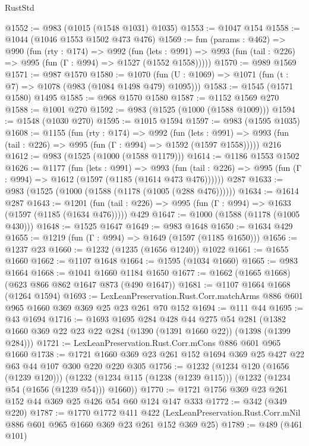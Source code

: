 \begin{lexlean}{RustStd}
\begin{coremodule}
@1552 := @983 (@1015 (@1548 @1031) @1035)
@1553 := @1047 @154
@1558 := @1044 (@1046 @1553 @1502 @473 @476)
@1569 := fun (params : @462) =>
  @990
    (fun (rty : @174) =>
    @992
      (fun (lets : @991) =>
      @993 (fun (tail : @226) => @995 (fun (Γ : @994) => @1527 (@1552 @1558)))))
@1570 := @989 @1569
@1571 := @987 @1570
@1580 := @1070 (fun (U : @1069) => @1071 (fun (t : @7) => @1078 (@983 (@1084 @1498 @479) @1095)))
@1583 := @1545 (@1571 @1580) @1495
@1585 := @968 @1570 @1580
@1587 := @1152 @1569 @270
@1588 := @1001 @270
@1592 := @983 (@1525 (@1000 (@1588 @1009)))
@1594 := @1548 (@1030 @270)
@1595 := @1015 @1594
@1597 := @983 (@1595 @1035)
@1608 := @1155
    (fun (rty : @174) =>
    @992
      (fun (lets : @991) =>
      @993 (fun (tail : @226) => @995 (fun (Γ : @994) => @1592 (@1597 @1558)))))
    @216
@1612 := @983 (@1525 (@1000 (@1588 @1179)))
@1614 := @1186 @1553 @1502
@1626 := @1177
    (fun (lets : @991) =>
    @993 (fun (tail : @226) => @995 (fun (Γ : @994) => @1612 (@1597 (@1185 (@1614 @473 @476))))))
    @287
@1633 := @983 (@1525 (@1000 (@1588 (@1178 (@1005 (@288 @476))))))
@1634 := @1614 @287
@1643 := @1201
    (fun (tail : @226) => @995 (fun (Γ : @994) => @1633 (@1597 (@1185 (@1634 @476)))))
    @429
@1647 := @1000 (@1588 (@1178 (@1005 @430)))
@1648 := @1525 @1647
@1649 := @983 @1648
@1650 := @1634 @429
@1655 := @1219 (fun (Γ : @994) => @1649 (@1597 (@1185 @1650)))
@1656 := @1237 @23
@1660 := @1232 (@1235 (@1656 @1240)) @1022
@1661 := @1655 @1660
@1662 := @1107 @1648
@1664 := @1595 (@1034 @1660)
@1665 := @983 @1664
@1668 := @1041 @1660 @1184 @1650
@1677 := @1662 (@1665 @1668) (@623 @866 @862 @1647 @873 (@490 @1647))
@1681 := @1107 @1664 @1668 (@1264 @1594)
@1693 := LexLeanPreservation.Rust.Corr.matchArms
    @886
    @601
    @965
    @1660
    @369
    @369
    @25
    @23
    @261
    @70
    @152
@1694 := @111 @44
@1695 := @43 @1694
@1716 := @1693
    @1695
    @284
    @428
    @44
    @275
    @54
    @281
    (@1382 @1660 @369 @22 @23 @22 @284 (@1390 (@1391 @1660 @22)) (@1398 (@1399 @284)))
@1721 := LexLeanPreservation.Rust.Corr.mCons @886 @601 @965 @1660
@1738 := @1721 @1660 @369 @23 @261 @152 @1694 @369 @25 @427 @22 @63 @44 @107 @300 @220 @220 @305
@1756 := @1232
    (@1234 @120 (@1656 (@1239 @120)))
    (@1232 (@1234 @115 (@1238 (@1239 @115))) (@1232 (@1234 @54 (@1656 (@1239 @54))) @1660))
@1770 := @1721 @1756 @369 @23 @261 @152 @44 @369 @25 @426 @54 @60 @124 @147 @333
@1772 := @342 (@349 @220)
@1787 := @1770
    @1772
    @411
    @422
    (LexLeanPreservation.Rust.Corr.mNil @886 @601 @965 @1660 @369 @23 @261 @152 @369 @25)
@1789 := @489 (@461 @101)

\end{coremodule}
\end{lexlean}
